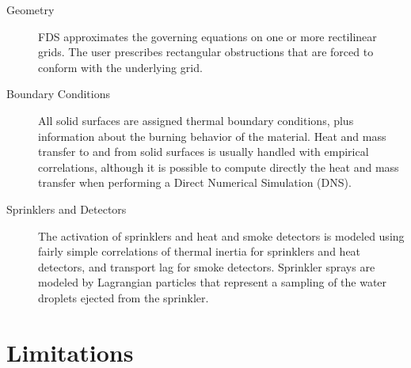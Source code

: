 \documentclass[11pt]{book}
\begin{document}
\begin{description}
\item[Geometry] FDS approximates the governing equations on one or more rectilinear grids. The user prescribes rectangular obstructions that are forced to conform with the underlying grid.
\item[Boundary Conditions] All solid surfaces are assigned thermal boundary conditions, plus information about the burning behavior of the material. Heat and mass transfer to and from solid surfaces is usually handled with empirical correlations, although it is possible to compute directly the heat and mass transfer when performing a Direct Numerical Simulation (DNS).
\item[Sprinklers and Detectors] The activation of sprinklers and heat and smoke detectors is modeled using fairly simple correlations of thermal inertia for sprinklers and heat detectors, and transport lag for smoke detectors. Sprinkler sprays are modeled by Lagrangian particles that represent a sampling of the water droplets ejected from the sprinkler.
\end{description}


\section{Limitations}
\end{document}
